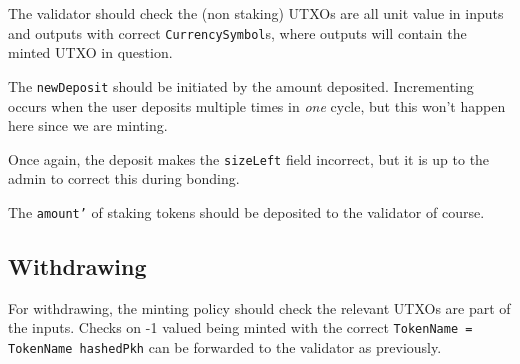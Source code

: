 \documentclass[10pt, a4paper]{article}
\theoremstyle{definition}
\begin{document}
\begin{enumerate}
{The validator should check the (non staking) UTXOs are all unit value in inputs and outputs with correct \texttt{CurrencySymbol}s, where outputs will contain the minted UTXO in question.

The \texttt{newDeposit} should be initiated by the amount deposited. Incrementing occurs when the user deposits multiple times in \textit{one} cycle, but this won't happen here since we are minting.

Once again, the deposit makes the \texttt{sizeLeft} field incorrect, but it is up to the admin to correct this during bonding.

The \texttt{amount'} of staking tokens should be deposited to the validator of course.
}
\end{enumerate}

\subsection{Withdrawing}\label{subsection:Withdrawing}
For withdrawing, the minting policy should check the relevant UTXOs are part of the inputs. Checks on -1 valued being minted with the correct \texttt{TokenName = TokenName hashedPkh} can be forwarded to the validator as previously.
\end{document}
